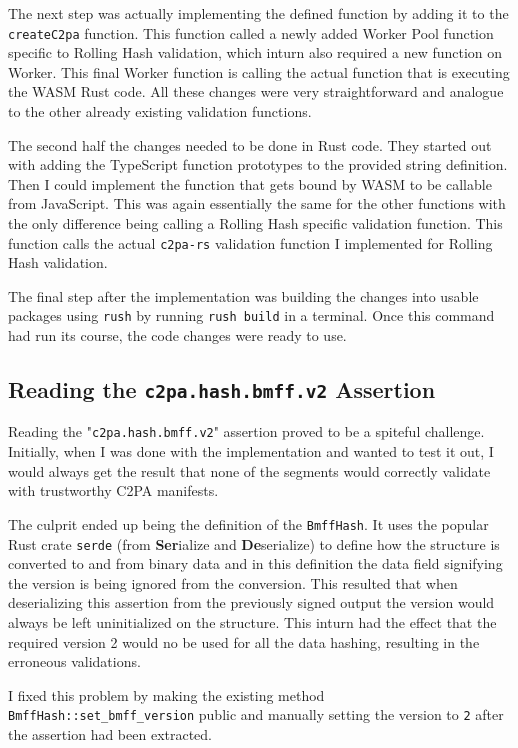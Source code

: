 The next step was actually implementing the defined function by adding it to the \texttt{createC2pa} function. This function called a newly added Worker Pool function specific to Rolling Hash validation, which inturn also required a new function on Worker. This final Worker function is calling the actual function that is executing the WASM Rust code. All these changes were very straightforward and analogue to the other already existing validation functions.

The second half the changes needed to be done in Rust code. They started out with adding the TypeScript function prototypes to the provided string definition. Then I could implement the function that gets bound by WASM to be callable from JavaScript. This was again essentially the same for the other functions with the only difference being calling a Rolling Hash specific validation function. This function calls the actual \texttt{c2pa-rs} validation function I implemented for Rolling Hash validation.

The final step after the implementation was building the changes into usable packages using \texttt{rush} by running \texttt{rush build} in a terminal. Once this command had run its course, the code changes were ready to use.

\subsection{Reading the \texttt{c2pa.hash.bmff.v2} Assertion}

Reading the "\texttt{c2pa.hash.bmff.v2}" assertion proved to be a spiteful challenge. Initially, when I was done with the implementation and wanted to test it out, I would always get the result that none of the segments would correctly validate with trustworthy C2PA manifests.

The culprit ended up being the definition of the \texttt{BmffHash}. It uses the popular Rust crate \texttt{serde} (from \textbf{Ser}ialize and \textbf{De}serialize) to define how the structure is converted to and from binary data and in this definition the data field signifying the version is being ignored from the conversion. This resulted that when deserializing this assertion from the previously signed output the version would always be left uninitialized on the structure. This inturn had the effect that the required version 2 would no be used for all the data hashing, resulting in the erroneous validations.

I fixed this problem by making the existing method \texttt{BmffHash::set\_bmff\_version} public and manually setting the version to \texttt{2} after the assertion had been extracted.

